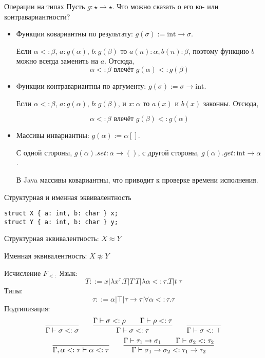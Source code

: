 \documentclass[aspectratio=169,dvipsnames,usenames]{beamer}
\begin{document}
\begin{frame}{Операции на типах}
Пусть $g : \star \rightarrow \star$. Что можно сказать о его ко- или контравариантности?

\begin{itemize}
\item Функции ковариантны по результату: $g(\sigma) := \text{int}\rightarrow\sigma$. 

Если $\alpha <: \beta$, $a : g(\alpha)$, $b : g(\beta)$ то $a(n): \alpha, b(n): \beta$, 
поэтому функцию $b$ можно всегда заменить на $a$. Отсюда,
$$\alpha <: \beta \text{ влечёт } g(\alpha) <: g(\beta)$$

\item Функции контравариантны по аргументу: $g(\sigma) := \sigma\rightarrow\text{int}$. 

Если $\alpha <: \beta$, $a : g(\alpha)$, $b : g(\beta)$, и $x : \alpha$ то
$a(x)$ и $b(x)$ законны. Отсюда,

$$\alpha <: \beta \text{ влечёт } g(\beta) <: g(\alpha)$$

\item Массивы инвариантны: $g(\alpha) := \alpha[]$.

С одной стороны, $g(\alpha).set : \alpha \rightarrow ()$, с другой стороны, $g(\alpha).get : \text{int} \rightarrow \alpha$.

В Java массивы ковариантны, что приводит к проверке времени исполнения.

\end{itemize}
\end{frame}

\begin{frame}[fragile]{Структурная и именная эквивалентность}
\begin{verbatim}
struct X { a: int, b: char } x;
struct Y { a: int, b: char } y;
\end{verbatim}

Структурная эквивалентность: $X \approx Y$

Именная эквивалентность: $X \not\approx Y$

\end{frame}

\begin{frame}{Исчисление $F_{<:}$}
Язык:
$$ T ::= x | \lambda x^\tau.T | T\ T | \lambda \alpha<:\tau.T| t\ \tau$$
Типы:
$$ \tau ::= \alpha|\top|\tau\rightarrow\tau|\forall\alpha<:\tau.\tau$$
Подтипизация:
$$\infer{\Gamma\vdash\sigma<:\sigma}{}\quad\quad\infer{\Gamma\vdash\sigma<:\tau}{\Gamma\vdash\sigma<:\rho\quad\quad\Gamma\vdash\rho<:\tau}\quad\quad\infer{\Gamma\vdash\sigma<:\top}{}$$
$$\infer{\Gamma,\alpha<:\tau\vdash\alpha<:\tau}{}\quad\quad\infer{\Gamma\vdash\sigma_1\rightarrow\sigma_2<:\tau_1\rightarrow\tau_2}{\Gamma\vdash\tau_1\rightarrow\sigma_1\quad\quad\Gamma\vdash\sigma_2<:\tau_2}$$


\end{frame}
\end{document}
